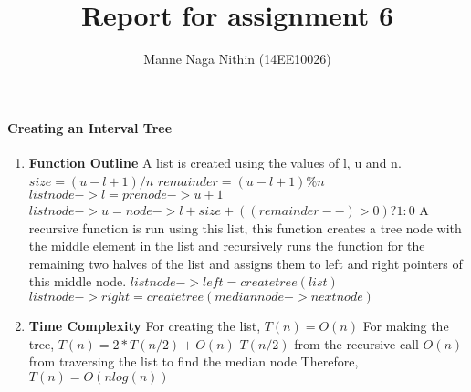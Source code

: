 \documentclass[a4paper,11pt]{article}
\title{Report for assignment 6}
\author{Manne Naga Nithin (14EE10026)}
\begin{document}
\maketitle

\paragraph{Creating an Interval Tree}
\begin{enumerate}
 \item \textbf{Function Outline}\newline
A list is created using the values of l, u and n.\newline
$size=(u-l+1)/n$\newline
$remainder=(u-l+1)\%n$\newline
$listnode->l=prenode->u+1$\newline
$listnode->u=node->l+size+((remainder--)>0)?1:0$\newline
A recursive function is run using this list, this function creates a tree node with the middle element in the list and recursively runs the function for the remaining two halves of the list and assigns them to left and right pointers of this middle node.\newline
$listnode->left=createtree(list)$\newline
$listnode->right=createtree(mediannode->nextnode)$\newline

 \item \textbf{Time Complexity}\newline
 For creating the list,\newline
 $T(n)=O(n)$\newline
 For making the tree,\newline
 $T(n)=2*T(n/2)+O(n)$\newline
 $T(n/2)$ from the recursive call\newline
 $O(n)$ from traversing the list to find the median node\newline 
 Therefore, $T(n)=O(nlog(n))$

\end{enumerate}
\end{document}
